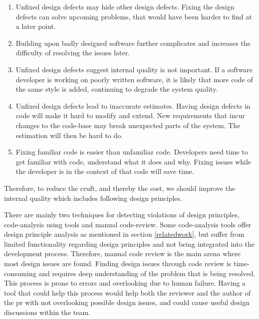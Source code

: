 \documentclass[pdftex,10pt,b5paper,twoside]{report}
\begin{document}
\begin{enumerate}
    \item Unfixed design defects may hide other design defects. Fixing the design defects can solve upcoming problems, that would have been harder to find at a later point.
    \item Building upon badly designed software further complicates and increases the difficulty of resolving the issues later.
  
    \item Unfixed design defects suggest internal quality is not important. If a software developer is working on poorly written software, it is likely that more code of the same style is added, continuing to degrade the system quality.
   
    \item Unfixed design defects lead to inaccurate estimates. Having design defects in code will make it hard to modify and extend. New requirements that incur changes to the code-base may break unexpected parts of the system. The estimation will then be hard to do.
   
    \item Fixing familiar code is easier than unfamiliar code. Developers need time to get familiar with code, understand what it does and why. Fixing issues while the developer is in the context of that code will save time.
\end{enumerate}

Therefore, to reduce the cruft, and thereby the cost, we should improve the internal quality which includes following design principles.




There are mainly two techniques for detecting violations of design principles, code-analysis using tools and manual code-review. Some code-analysis tools offer design principle analysis as mentioned in section \ref{relatedwork}, but suffer from limited functionality regarding design principles and not being integrated into the development process. Therefore, manual code review is the main arena where most design issues are found. Finding design issues through code review is time-consuming and requires deep understanding of the problem that is being resolved. This process is prone to errors and overlooking due to human failure. Having a tool that could help this process would help both the reviewer and the author of the \gls{pr} with not overlooking possible design issues, and could cause useful design discussions within the team.
\end{document}

